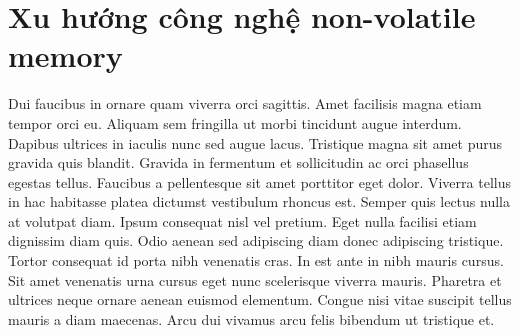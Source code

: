 \section{Xu hướng công nghệ non-volatile memory}
\label{chap:experiments}

Dui faucibus in ornare quam viverra orci sagittis. Amet facilisis magna etiam
tempor orci eu. Aliquam sem fringilla ut morbi tincidunt augue interdum.
Dapibus ultrices in iaculis nunc sed augue lacus. Tristique magna sit amet
purus gravida quis blandit. Gravida in fermentum et sollicitudin ac orci
phasellus egestas tellus. Faucibus a pellentesque sit amet porttitor eget
dolor. Viverra tellus in hac habitasse platea dictumst vestibulum rhoncus est.
Semper quis lectus nulla at volutpat diam. Ipsum consequat nisl vel pretium.
Eget nulla facilisi etiam dignissim diam quis. Odio aenean sed adipiscing diam
donec adipiscing tristique. Tortor consequat id porta nibh venenatis cras. In
est ante in nibh mauris cursus. Sit amet venenatis urna cursus eget nunc
scelerisque viverra mauris. Pharetra et ultrices neque ornare aenean euismod
elementum. Congue nisi vitae suscipit tellus mauris a diam maecenas. Arcu dui
vivamus arcu felis bibendum ut tristique et.